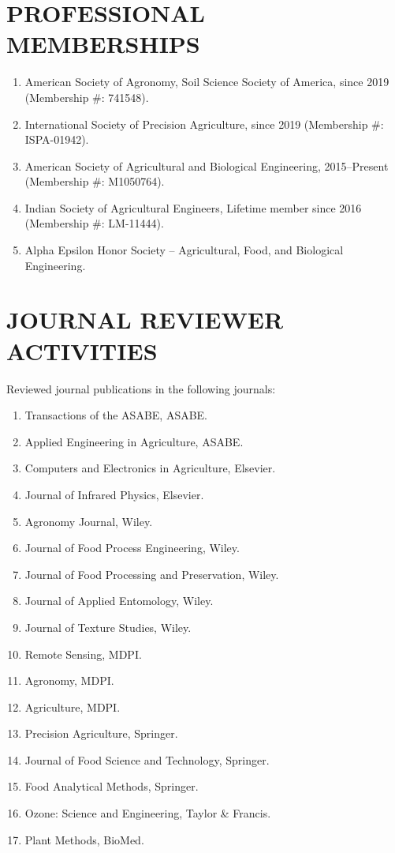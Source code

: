 \documentclass[11pt]{article}
\begin{document}
\section*{PROFESSIONAL MEMBERSHIPS}
\begin{enumerate} [itemsep=-1ex]
\item American Society of Agronomy, Soil Science Society of America, since 2019  (Membership \#: 741548).
\item International Society of Precision Agriculture, since 2019  (Membership \#: ISPA-01942).
\item American Society of Agricultural and Biological Engineering, 2015--Present (Membership \#: M1050764).
\item Indian Society of Agricultural Engineers, Lifetime member since 2016 (Membership \#: LM-11444).
\item Alpha Epsilon Honor Society -- Agricultural, Food, and Biological Engineering.
\end{enumerate}


\section*{JOURNAL REVIEWER ACTIVITIES}
Reviewed journal publications in the following journals:
\begin{enumerate}[itemsep=-0.8ex]
\item Transactions of the ASABE, ASABE.
\item Applied Engineering in Agriculture, ASABE.
\item Computers and Electronics in Agriculture, Elsevier.
\item Journal of Infrared Physics, Elsevier.
\item Agronomy Journal, Wiley.
\item Journal of Food Process Engineering, Wiley.
\item Journal of Food Processing and Preservation, Wiley.
\item Journal of Applied Entomology, Wiley. 
\item Journal of Texture Studies, Wiley. 
\item Remote Sensing, MDPI.
\item Agronomy, MDPI.
\item Agriculture, MDPI.
\item Precision Agriculture, Springer.
\item Journal of Food Science and Technology, Springer.
\item Food Analytical Methods, Springer.
\item Ozone: Science and Engineering, Taylor \& Francis.
\item Plant Methods, BioMed.
\end{enumerate}
\end{document}
